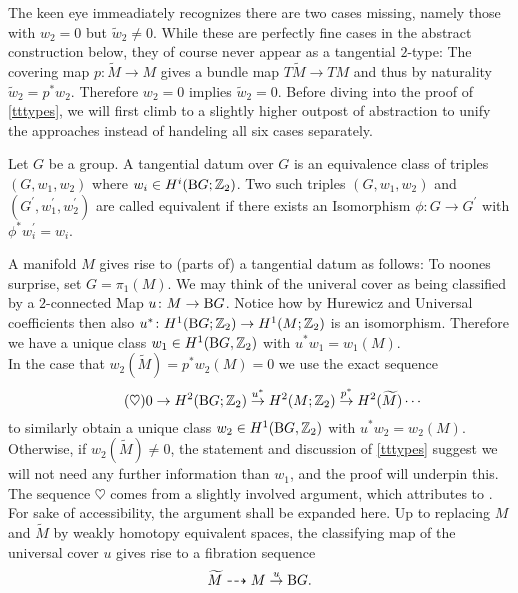 The keen eye immeadiately recognizes there are two cases missing, namely those with $w_2 = 0$ but $\widetilde{w}_2 \neq 0$. 
While these are perfectly fine cases in the abstract construction below, they of course never appear as a tangential $2$-type:
The covering map $p\colon \widetilde{M} \to M$ gives a bundle map $T\widetilde{M} \to T M $ and thus by naturality $\widetilde{w}_2 = p^\ast w_2$. 
Therefore $w_2 = 0$ implies $\widetilde{w}_2 = 0$.
Before diving into the proof of \ref{tttypes}, we will first climb to a slightly higher outpost of abstraction to unify the approaches instead of handeling all six cases separately.
\begin{defi}
    Let $G$ be a group. A tangential datum over $G$ is an equivalence class of triples $(G,w_1,w_2)$ where $w_i \in H^i(\mathrm{B} G ;\mathbb{Z}_2)$. Two such triples $(G,w_1,w_2)$ and $(G^\prime, w_1^\prime, w_2^\prime)$ are called equivalent if there exists an Isomorphism $\phi\colon G \to G^\prime$ with $\phi^\ast w_i^\prime = w_i$.
\end{defi}
A manifold $M$ gives rise to (parts of) a tangential datum as follows: 
To noones surprise, set $G = \pi_1(M)$.
We may think of the univeral cover as being classified by a $2$-connected Map $u\colon M \to \mathrm{B} G$.
Notice how by Hurewicz and Universal coefficients then also $u^\ast\colon H^1(\mathrm{B} G;\mathbb{Z}_2) \to H^1(M;\mathbb{Z}_2)$ is an isomorphism.
Therefore we have a unique class $w_1 \in H^1(\mathrm{B} G,\mathbb{Z}_2)$ with $u^\ast w_1 = w_1(M)$.\\
In the case that $w_2(\widetilde{M}) = p^\ast w_2(M) = 0$ we use the exact sequence 
\begin{equation*}\tag{$\heartsuit$}\label{heartseq}
    0 \to H^2(\mathrm{B} G ; \mathbb{Z}_2) \overset{u^\ast}{\to} H^2(M;\mathbb{Z}_2) \overset{p^\ast}{\to} H^2(\widetilde{M}) \cdots
\end{equation*}
to similarly obtain a unique class $w_2 \in H^1(\mathrm{B} G,\mathbb{Z}_2)$ with $u^\ast w_2 = w_2(M)$. 
Otherwise, if $w_2(\widetilde{M})\neq 0$, the statement and discussion of \ref{tttypes} suggest we will not need any further information than $w_1$, and the proof will underpin this.\\
The sequence $\heartsuit$ comes from a slightly involved argument, which \cite{kreck:sad} attributes to \cite{brown:cog}. 
For sake of accessibility, the argument shall be expanded here.
Up to replacing $M$ and $\widetilde{M}$ by weakly homotopy equivalent spaces, the classifying map of the universal cover $u$ gives rise to a fibration sequence
\begin{equation*}
    \widetilde{M} \dashrightarrow M \overset{u}{\to} \mathrm{B} G.
\end{equation*}
